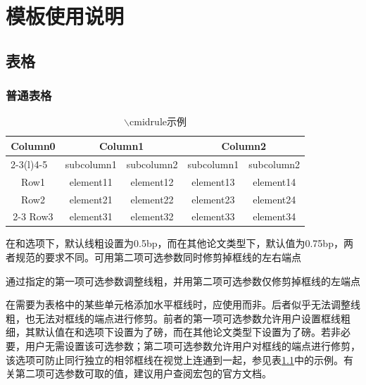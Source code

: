 


\chapter{模板使用说明}


\section{表格}


\subsection{普通表格}


\begin{table}[htp]
    \caption{$\backslash$cmidrule示例}\label{tab: cmidrule示例}
    \begin{threeparttable}
        \begin{tabular}{ccccc}
            \toprule
            \multirow{2}{*}{Column0} &  \multicolumn{2}{c}{Column1\tnote{1}} & \multicolumn{2}{c}{Column2\tnote{2}} \\
            \cmidrule(lr){2-3}\cmidrule[2.5bp](l){4-5}
            ~     & subcolumn1 & subcolumn2 & subcolumn1 & subcolumn2 \\
            \midrule
            Row1  & element11 & element12 &element13 & element14 \\
            Row2  & element21 & element22 &element23 & element24 \\
            \cmidrule{2-3}\cmidrule[2.5bp]{4-5}
            Row3  & element31 & element32 &element33 & element34 \\
            \bottomrule
        \end{tabular}
        \begin{tablenotes}
            \item[1] 在和选项下，默认线粗设置为0.5bp，而在其他论文类型下，默认值为0.75bp，两者规范的要求不同。可用第二项可选参数同时修剪掉框线的左右端点
            \item[2] 通过指定的第一项可选参数调整线粗，并用第二项可选参数仅修剪掉框线的左端点
        \end{tablenotes}
    \end{threeparttable}
\end{table}

在需要为表格中的某些单元格添加水平框线时，应使用\newline{}而非。后者似乎无法调整线粗，也无法对框线的端点进行修剪。前者的第一项可选参数允许用户设置框线粗细，其默认值在和选项下设置为了磅，而在其他论文类型下设置为了磅。若非必要，用户无需设置该可选参数；第二项可选参数允许用户对框线的端点进行修剪，该选项可防止同行独立的相邻框线在视觉上连通到一起，参见表\ref{tab: cmidrule示例}中的示例。有关第二项可选参数可取的值，建议用户查阅\href{https://mirrors.sustech.edu.cn/CTAN/macros/latex/contrib/booktabs/booktabs.pdf}{\ttfamily\color{DarkRed}}宏包的官方文档。

